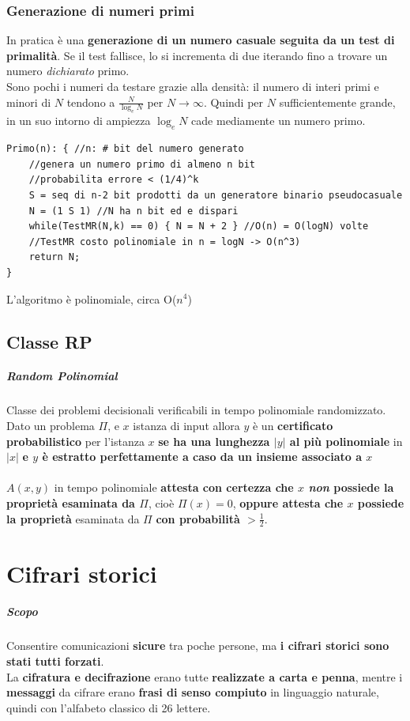 \documentclass[10pt]{book}
\begin{document}
\subsection{Generazione di numeri primi}
In pratica è una \textbf{generazione di un numero casuale seguita da un test di primalità}. Se il test fallisce, lo si incrementa di due iterando fino a trovare un numero \textit{dichiarato} primo.\\
Sono pochi i numeri da testare grazie alla densità: il numero di interi primi e minori di $N$ tendono a $\frac{N}{\log_e N}$ per $N\to\infty$. Quindi per $N$ sufficientemente grande, in un suo intorno di ampiezza $\log_e N$ cade mediamente un numero primo.
\begin{lstlisting}
Primo(n): { //n: # bit del numero generato
	//genera un numero primo di almeno n bit
	//probabilita errore < (1/4)^k
	S = seq di n-2 bit prodotti da un generatore binario pseudocasuale
	N = (1 S 1) //N ha n bit ed e dispari
	while(TestMR(N,k) == 0) { N = N + 2 } //O(n) = O(logN) volte
	//TestMR costo polinomiale in n = logN -> O(n^3)
	return N;
}
\end{lstlisting}
L'algoritmo è polinomiale, circa O($n^4$)
\section{Classe RP}
\paragraph{Random Polinomial} Classe dei problemi decisionali verificabili in tempo polinomiale randomizzato.\\
Dato un problema $\Pi$, e $x$ istanza di input allora $y$ è un \textbf{certificato probabilistico} per l'istanza $x$ \textbf{se ha una lunghezza $|y|$ al più polinomiale} in $|x|$ \textbf{e $y$ è estratto perfettamente a caso da un insieme associato a $x$}\\\\
$A(x,y)$ in tempo polinomiale \textbf{attesta con certezza che $x$ \textit{non} possiede la proprietà esaminata da $\Pi$}, cioè $\Pi(x) = 0$, \textbf{oppure attesta che $x$ possiede la proprietà} esaminata da $\Pi$ \textbf{con probabilità $> \frac{1}{2}$}.
\chapter{Cifrari storici}
\paragraph{Scopo} Consentire comunicazioni \textbf{sicure} tra poche persone, ma \textbf{i cifrari storici sono stati tutti forzati}.\\
La \textbf{cifratura e decifrazione} erano tutte \textbf{realizzate a carta e penna}, mentre i \textbf{messaggi} da cifrare erano \textbf{frasi di senso compiuto} in linguaggio naturale, quindi con l'alfabeto classico di 26 lettere.
\end{document}
